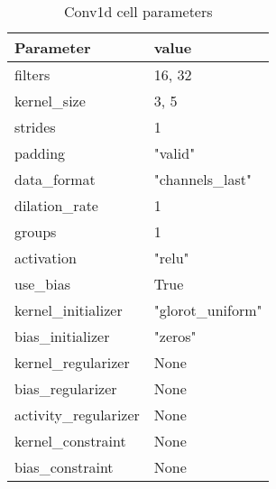 \begin{table}[h]
  \centering
  \caption{Conv1d cell parameters}
  \label{table:Conv1d-cell-parameters}
  \begin{tabular}{|l|l|}\hline
    Parameter             & value             \\ \hline
    \hline
    filters               & 16, 32            \\ \hline
    kernel\_size          & 3, 5              \\ \hline
    strides               & 1                 \\ \hline
    padding               & "valid"           \\ \hline
    data\_format          & "channels\_last"  \\ \hline
    dilation\_rate        & 1                 \\ \hline
    groups                & 1                 \\ \hline
    activation            & "relu"            \\ \hline
    use\_bias             & True              \\ \hline
    kernel\_initializer   & "glorot\_uniform" \\ \hline
    bias\_initializer     & "zeros"           \\ \hline
    kernel\_regularizer   & None              \\ \hline
    bias\_regularizer     & None              \\ \hline
    activity\_regularizer & None              \\ \hline
    kernel\_constraint    & None              \\ \hline
    bias\_constraint      & None              \\ \hline
    \hline
  \end{tabular}
\end{table}


